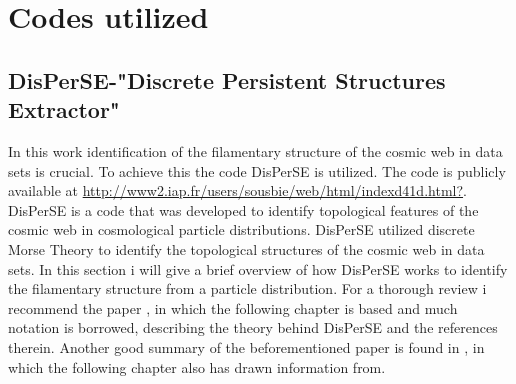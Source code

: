 \chapter{Codes utilized}
\section{DisPerSE-"Discrete Persistent Structures Extractor"}
In this work identification of the filamentary structure of the cosmic web in
data sets is crucial. To achieve this the code
DisPerSE\cite{2011MNRAS.414..350S}\cite{2011MNRAS.414..384S} is utilized. The
code is publicly available at \url{http://www2.iap.fr/users/sousbie/web/html/indexd41d.html?}.
DisPerSE is a code that was developed to identify topological features of the
cosmic web in cosmological particle distributions. DisPerSE utilized discrete
Morse Theory to identify the topological structures of the cosmic web in data
sets. In this section i will give a brief overview of how DisPerSE works to
identify the filamentary structure from a particle distribution. For a thorough
review i recommend the paper \cite{2011MNRAS.414..350S}, in which the following
chapter is based and much notation is borrowed, describing the theory behind DisPerSE and the
references therein. Another good summary of the beforementioned paper is found in \cite{Alexhothesis}, in which the following chapter also has drawn information from.
